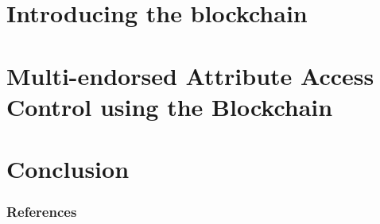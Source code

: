 \documentclass[table]{beamer}
\begin{document}
\section{Introducing the blockchain}




\section[MAAC-B]{Multi-endorsed Attribute Access Control using the Blockchain}




\section{Conclusion}



\begin{frame}[allowframebreaks]
        \frametitle{References}
        
        
\end{frame}
\end{document}
